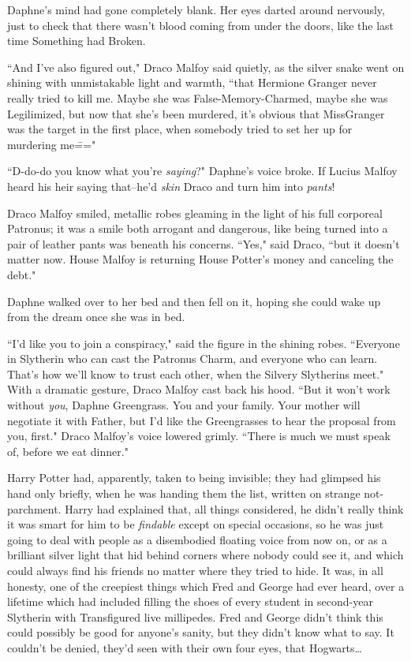 Daphne's mind had gone completely blank. Her eyes darted around nervously, just to check that there wasn't blood coming from under the doors, like the last time Something had Broken.

``And I've also figured out," Draco Malfoy said quietly, as the silver snake went on shining with unmistakable light and warmth, ``that Hermione Granger never really tried to kill me. Maybe she was False-Memory-Charmed, maybe she was Legilimized, but now that she's been murdered, it's obvious that Miss\?Granger was the target in the first place, when somebody tried to set her up for murdering me\==="

``D-do-do you know what you're \emph{saying}?" Daphne's voice broke. If Lucius Malfoy heard his heir saying that\---he'd \emph{skin} Draco and turn him into \emph{pants}!

Draco Malfoy smiled, metallic robes gleaming in the light of his full corporeal Patronus; it was a smile both arrogant and dangerous, like being turned into a pair of leather pants was beneath his concerns. ``Yes," said Draco, ``but it doesn't matter now. House Malfoy is returning House Potter's money and canceling the debt."

Daphne walked over to her bed and then fell on it, hoping she could wake up from the dream once she was in bed.

``I'd like you to join a conspiracy," said the figure in the shining robes. ``Everyone in Slytherin who can cast the Patronus Charm, and everyone who can learn. That's how we'll know to trust each other, when the Silvery Slytherins meet." With a dramatic gesture, Draco Malfoy cast back his hood. ``But it won't work without \emph{you}, Daphne Greengrass. You and your family. Your mother will negotiate it with Father, but I'd like the Greengrasses to hear the proposal from you, first." Draco Malfoy's voice lowered grimly. ``There is much we must speak of, before we eat dinner."

\later

Harry Potter had, apparently, taken to being invisible; they had glimpsed his hand only briefly, when he was handing them the list, written on strange not-parchment. Harry had explained that, all things considered, he didn't really think it was smart for him to be \emph{findable} except on special occasions, so he was just going to deal with people as a disembodied floating voice from now on, or as a brilliant silver light that hid behind corners where nobody could see it, and which could always find his friends no matter where they tried to hide. It was, in all honesty, one of the creepiest things which Fred and George had ever heard, over a lifetime which had included filling the shoes of every student in second-year Slytherin with Transfigured live millipedes. Fred and George didn't think this could possibly be good for anyone's sanity, but they didn't know what to say. It couldn't be denied, they'd seen with their own four eyes, that Hogwarts{\ldots}

